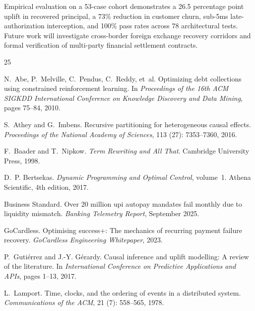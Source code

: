 \documentclass[10pt, twocolumn, a4paper]{article}
\begin{document}
Empirical evaluation on a 53-case cohort demonstrates a 26.5 percentage point uplift in recovered principal, a 73\% reduction in customer churn, sub-5ms late-authorization interception, and 100\% pass rates across 78 architectural tests. Future work will investigate cross-border foreign exchange recovery corridors and formal verification of multi-party financial settlement contracts.


\begin{thebibliography}{25}
\providecommand{\natexlab}[1]{#1}

N.~Abe, P.~Melville, C.~Pendus, C.~Reddy, et~al.
\newblock Optimizing debt collections using constrained reinforcement learning.
\newblock In \emph{Proceedings of the 16th ACM SIGKDD International Conference on Knowledge Discovery and Data Mining}, pages 75--84, 2010.

S.~Athey and G.~Imbens.
\newblock Recursive partitioning for heterogeneous causal effects.
\newblock \emph{Proceedings of the National Academy of Sciences}, 113 (27): 7353--7360, 2016.

F.~Baader and T.~Nipkow.
\newblock \emph{Term Rewriting and All That}.
\newblock Cambridge University Press, 1998.

D.~P. Bertsekas.
\newblock \emph{Dynamic Programming and Optimal Control}, volume~1.
\newblock Athena Scientific, 4th edition, 2017.

{Business Standard}.
\newblock Over 20 million upi autopay mandates fail monthly due to liquidity mismatch.
\newblock \emph{Banking Telemetry Report}, September 2025.

{GoCardless}.
\newblock Optimising success+: The mechanics of recurring payment failure recovery.
\newblock \emph{GoCardless Engineering Whitepaper}, 2023.

P.~Guti{\'e}rrez and J.-Y. G{\'e}rardy.
\newblock Causal inference and uplift modelling: A review of the literature.
\newblock In \emph{International Conference on Predictive Applications and APIs}, pages 1--13, 2017.

L.~Lamport.
\newblock Time, clocks, and the ordering of events in a distributed system.
\newblock \emph{Communications of the ACM}, 21 (7): 558--565, 1978.


\end{thebibliography}
\end{document}
